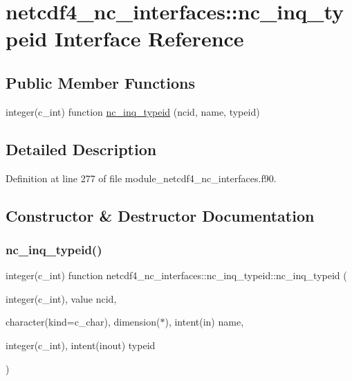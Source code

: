 \hypertarget{interfacenetcdf4__nc__interfaces_1_1nc__inq__typeid}{}\section{netcdf4\+\_\+nc\+\_\+interfaces\+:\+:nc\+\_\+inq\+\_\+typeid Interface Reference}
\label{interfacenetcdf4__nc__interfaces_1_1nc__inq__typeid}
\subsection*{Public Member Functions}
\begin{DoxyCompactItemize}
\item 
integer(c\+\_\+int) function \hyperlink{interfacenetcdf4__nc__interfaces_1_1nc__inq__typeid_ab75ba0eb3306158d6c9b4baca9ef7b36}{nc\+\_\+inq\+\_\+typeid} (ncid, name, typeid)
\end{DoxyCompactItemize}


\subsection{Detailed Description}


Definition at line 277 of file module\+\_\+netcdf4\+\_\+nc\+\_\+interfaces.\+f90.



\subsection{Constructor \& Destructor Documentation}
\mbox{\label{interfacenetcdf4__nc__interfaces_1_1nc__inq__typeid_ab75ba0eb3306158d6c9b4baca9ef7b36}} 
\subsubsection{\texorpdfstring{nc\+\_\+inq\+\_\+typeid()}{nc\_inq\_typeid()}}
{\footnotesize\ttfamily integer(c\+\_\+int) function netcdf4\+\_\+nc\+\_\+interfaces\+::nc\+\_\+inq\+\_\+typeid\+::nc\+\_\+inq\+\_\+typeid (\begin{DoxyParamCaption}\item[{integer(c\+\_\+int), value}]{ncid,  }\item[{character(kind=c\+\_\+char), dimension($\ast$), intent(in)}]{name,  }\item[{integer(c\+\_\+int), intent(inout)}]{typeid }\end{DoxyParamCaption})}



